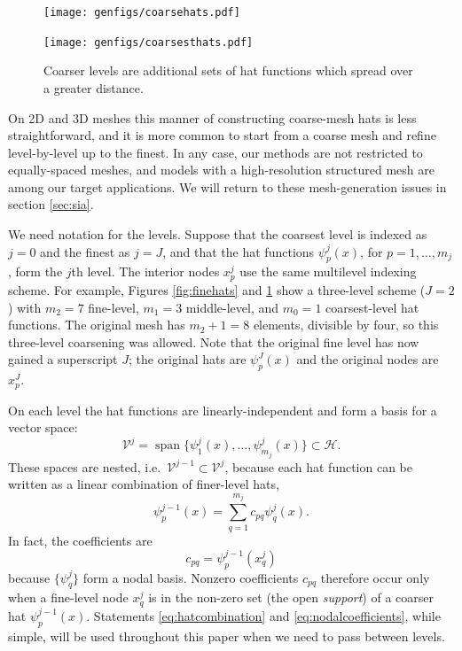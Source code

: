 \documentclass[letterpaper,final,12pt,reqno]{amsart}
\theoremstyle{claim}
\numberwithin{equation}{section}
\numberwithin{figure}{section}
\numberwithin{table}{section}
\numberwithin{theorem}{section}
\begin{document}
\begin{figure}
\texttt{[image: genfigs/coarsehats.pdf]}
\smallskip

\texttt{[image: genfigs/coarsesthats.pdf]}
\caption{Coarser levels are additional sets of hat functions which spread over a greater distance.}
\label{fig:coarsehats}
\end{figure}

On 2D and 3D meshes this manner of constructing coarse-mesh hats is less straightforward, and it is more common to start from a coarse mesh and refine level-by-level up to the finest.  In any case, our methods are not restricted to equally-spaced meshes, and models with a high-resolution structured mesh \cite[for example]{Bueler2016,Winkelmannetal2011} are among our target applications. We will return to these mesh-generation issues in section \ref{sec:sia}.

We need notation for the levels.  Suppose that the coarsest level is indexed as $j=0$ and the finest as $j=J$, and that the hat functions $\psi_p^j(x)$, for $p=1,\dots,m_j$, form the $j$th level.  The interior nodes $x_p^j$ use the same multilevel indexing scheme.  For example, Figures \ref{fig:finehats} and \ref{fig:coarsehats} show a three-level scheme ($J=2$) with $m_2=7$ fine-level, $m_1=3$ middle-level, and $m_0=1$ coarsest-level hat functions.  The original mesh has $m_2+1=8$ elements, divisible by four, so this three-level coarsening was allowed.  Note that the original fine level has now gained a superscript $J$; the original hats are $\psi_p^J(x)$ and the original nodes are $x_p^J$.

On each level the hat functions are linearly-independent and form a basis for a vector space:
\begin{equation}
  \mathcal{V}^j = \operatorname{span}\{\psi_1^j(x),\dots,\psi_{m_j}^j(x)\} \subset \mathcal{H}.  \label{eq:definevk}
\end{equation}
These spaces are nested, i.e.~$\mathcal{V}^{j-1} \subset \mathcal{V}^j$, because each hat function can be written as a linear combination of finer-level hats,
\begin{equation}
   \psi_p^{j-1}(x) = \sum_{q=1}^{m_j} c_{pq} \psi_q^j(x). \label{eq:hatcombination}
\end{equation}
In fact, the coefficients are
\begin{equation}
  c_{pq} = \psi_p^{j-1}(x_q^j) \label{eq:nodalcoefficients}
\end{equation}
because $\{\psi_q^j\}$ form a nodal basis.  Nonzero coefficients $c_{pq}$ therefore occur only when a fine-level node $x_q^j$ is in the non-zero set (the open \emph{support}) of a coarser hat $\psi_p^{j-1}(x)$.  Statements \eqref{eq:hatcombination} and \eqref{eq:nodalcoefficients}, while simple, will be used throughout this paper when we need to pass between levels.
\end{document}
